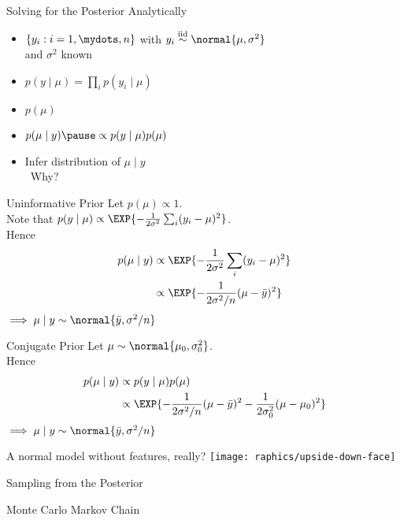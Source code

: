 \begin{frame}{Solving for the Posterior Analytically}
  \Large{
  \begin{itemize}
    \item[]  $\{y_i: i=1,\mydots,n\}$ with $y_i \overset{\text{iid}}{\sim} \normal{\mu, \sigma^2}$\\
    \quad\quad\quad\quad and $\sigma^2$ known\pause
    \item[]  $p(y \mid \mu) = \prod_i p(y_i \mid \mu)$\pause
    \item[]  $p(\mu)$\pause
    \item[]  $p(\mu \mid y)\pause \propto p(y \mid \mu) p(\mu)$\pause
    \item[]  Infer distribution of $\mu \mid y$\pause\\
    \quad\quad\, Why?
  \end{itemize}
  }
\end{frame}

\begin{frame}{Uninformative Prior}
  \Large{
  Let $p(\mu) \propto 1$.\pause\\
  Note that $p(y \mid \mu) \propto \EXP{-\frac{1}{2 \sigma^2}\sum_i (y_i - \mu)^2}$.\pause\\
  Hence
  \begin{align*}
    p(\mu \mid y) &\propto \EXP{-\frac{1}{2 \sigma^2}\sum_i (y_i - \mu)^2}\\
    &\propto \EXP{-\frac{1}{2\sigma^2/n}(\mu - \bar{y})^2}
  \end{align*}\pause
  $\implies \mu \mid y \sim \normal{\bar{y}, \sigma^2 / n}$
  }
\end{frame}

\begin{frame}{Conjugate Prior}
  \Large{
  Let $\mu \sim \normal{\mu_0, \sigma_0^2}$.\pause\\
  Hence
  \begin{align*}
    p(\mu \mid y) &\propto p(y \mid \mu) p(\mu)\\
    &\propto \EXP{-\frac{1}{2\sigma^2/n}(\mu - \bar{y})^2 -\frac{1}{2\sigma_0^2} (\mu - \mu_0)^2}
  \end{align*}\pause
  $\implies \mu \mid y \sim \normal{\bar{y}, \sigma^2 / n}$
  }
\end{frame}

\begin{frame}
  \vfill
  \centering
  \Large A normal model without features, really?
  \texttt{[image: raphics/upside-down-face]}
  \vfill
\end{frame}

\begin{frame}{Sampling from the Posterior}
\end{frame}

\begin{frame}{Monte Carlo Markov Chain}
\end{frame}
